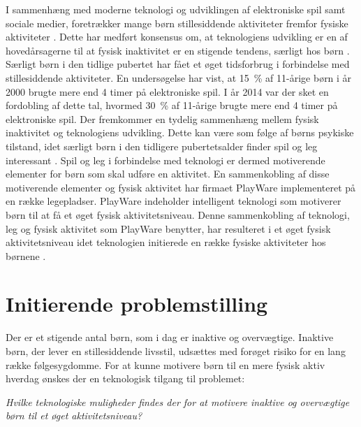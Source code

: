 I sammenhæng med moderne teknologi og udviklingen af elektroniske spil samt sociale medier, foretrækker mange børn stillesiddende aktiviteter fremfor fysiske aktiviteter \citep{Universitet2014}. Dette har medført konsensus om, at teknologiens udvikling er en af hovedårsagerne til at fysisk inaktivitet er en stigende tendens, særligt hos børn \citep{Kiens2007}. \newline
Særligt børn i den tidlige pubertet har fået et øget tidsforbrug i forbindelse med stillesiddende aktiviteter. En undersøgelse har vist, at 15~\% af 11-årige børn i år 2000 brugte mere end 4 timer på elektroniske spil. I år 2014 var der sket en fordobling af dette tal, hvormed 30~\% af 11-årige brugte mere end 4 timer på elektroniske spil. \citep{SKOLEBØRNS} \newline
Der fremkommer en tydelig sammenhæng mellem fysisk inaktivitet og teknologiens udvikling. Dette kan være som følge af børns psykiske tilstand, idet særligt børn i den tidligere pubertetsalder finder spil og leg interessant \citep{Wied2011}. Spil og leg i forbindelse med teknologi er dermed motiverende elementer for børn som skal udføre en aktivitet. En sammenkobling af disse motiverende elementer og fysisk aktivitet har firmaet PlayWare implementeret på en række legepladser. PlayWare indeholder intelligent teknologi som motiverer børn til at få et øget fysisk aktivitetsniveau. Denne sammenkobling af teknologi, leg og fysisk aktivitet som PlayWare benytter, har resulteret i et øget fysisk aktivitetsniveau idet teknologien initierede en række fysiske aktiviteter hos børnene \citep{Rishoej2010,PDF}. 

\section{Initierende problemstilling}
Der er et stigende antal børn, som i dag er inaktive og overvægtige. Inaktive børn, der lever en stillesiddende livsstil, udsættes med forøget risiko for en lang række følgesygdomme. For at kunne motivere børn til en mere fysisk aktiv hverdag ønskes der en teknologisk tilgang til problemet:

\begin{center}
\textit{Hvilke teknologiske muligheder findes der for at motivere inaktive og overvægtige børn til et øget aktivitetsniveau?}
\end{center}